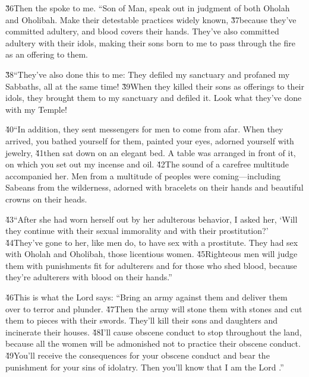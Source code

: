 \v{36}Then the  spoke to me. ``Son of Man, speak out in judgment of both Oholah and Oholibah. Make their detestable practices widely known, \v{37}because they've committed adultery, and blood covers their hands. They've also committed adultery with their idols, making their sons born to me to pass through the fire as an offering to them.

\v{38}``They've also done this to me: They defiled my sanctuary and profaned my Sabbaths, all at the same time! \v{39}When they killed their sons as offerings to their idols, they brought them to my sanctuary and defiled it. Look what they've done with my Temple!

\v{40}``In addition, they sent messengers for men to come from afar. When they arrived, you bathed yourself for them, painted your eyes, adorned yourself with jewelry, \v{41}then sat down on an elegant bed. A table was arranged in front of it, on which you set out my incense and oil. \v{42}The sound of a carefree multitude accompanied her. Men from a multitude of peoples were coming---including Sabeans from the wilderness, adorned with bracelets on their hands and beautiful crowns on their heads.

\v{43}``After she had worn herself out by her adulterous behavior, I asked her, `Will they continue with their sexual immorality and with their prostitution?' \v{44}They've gone to her, like men do, to have sex with a prostitute. They had sex with Oholah and Oholibah, those licentious women. \v{45}Righteous men will judge them with punishments fit for adulterers and for those who shed blood, because they're adulterers with blood on their hands.''

\v{46}This is what the Lord  says: ``Bring an army against them and deliver them over to terror and plunder. \v{47}Then the army will stone them with stones and cut them to pieces with their swords. They'll kill their sons and daughters and incinerate their houses. \v{48}I'll cause obscene conduct to stop throughout the land, because all the women will be admonished not to practice their obscene conduct. \v{49}You'll receive the consequences for your obscene conduct and bear the punishment for your sins of idolatry. Then you'll know that I am the Lord .''

